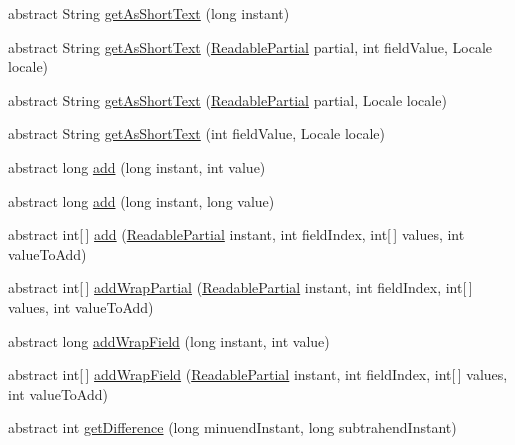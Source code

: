 \begin{DoxyCompactItemize}
abstract String \hyperlink{classorg_1_1joda_1_1time_1_1_date_time_field_ae648d4276a8ce391be96b790d4f46926}{get\-As\-Short\-Text} (long instant)
\item 
abstract String \hyperlink{classorg_1_1joda_1_1time_1_1_date_time_field_acdccf31887f52359f5185d95fe70d9e7}{get\-As\-Short\-Text} (\hyperlink{interfaceorg_1_1joda_1_1time_1_1_readable_partial}{Readable\-Partial} partial, int field\-Value, Locale locale)
\item 
abstract String \hyperlink{classorg_1_1joda_1_1time_1_1_date_time_field_a7717a977276611aa75a1fdf28fbf09ed}{get\-As\-Short\-Text} (\hyperlink{interfaceorg_1_1joda_1_1time_1_1_readable_partial}{Readable\-Partial} partial, Locale locale)
\item 
abstract String \hyperlink{classorg_1_1joda_1_1time_1_1_date_time_field_a7ef443a0920b8cde786fad1c84728c71}{get\-As\-Short\-Text} (int field\-Value, Locale locale)
\item 
abstract long \hyperlink{classorg_1_1joda_1_1time_1_1_date_time_field_a4f89071336324c49ca4a8038f1c35417}{add} (long instant, int value)
\item 
abstract long \hyperlink{classorg_1_1joda_1_1time_1_1_date_time_field_af32597234e1a9f2824b082b999a0bc69}{add} (long instant, long value)
\item 
abstract int\mbox{[}$\,$\mbox{]} \hyperlink{classorg_1_1joda_1_1time_1_1_date_time_field_aeda864911fd1eb6c3d358466c55e8deb}{add} (\hyperlink{interfaceorg_1_1joda_1_1time_1_1_readable_partial}{Readable\-Partial} instant, int field\-Index, int\mbox{[}$\,$\mbox{]} values, int value\-To\-Add)
\item 
abstract int\mbox{[}$\,$\mbox{]} \hyperlink{classorg_1_1joda_1_1time_1_1_date_time_field_a23e4d891841784ce3c6d425d9153a598}{add\-Wrap\-Partial} (\hyperlink{interfaceorg_1_1joda_1_1time_1_1_readable_partial}{Readable\-Partial} instant, int field\-Index, int\mbox{[}$\,$\mbox{]} values, int value\-To\-Add)
\item 
abstract long \hyperlink{classorg_1_1joda_1_1time_1_1_date_time_field_a2bec834f52305b161ce519cb19182fe0}{add\-Wrap\-Field} (long instant, int value)
\item 
abstract int\mbox{[}$\,$\mbox{]} \hyperlink{classorg_1_1joda_1_1time_1_1_date_time_field_ac97fc6b83bb004dfccdd144cc1fdd8f4}{add\-Wrap\-Field} (\hyperlink{interfaceorg_1_1joda_1_1time_1_1_readable_partial}{Readable\-Partial} instant, int field\-Index, int\mbox{[}$\,$\mbox{]} values, int value\-To\-Add)
\item 
abstract int \hyperlink{classorg_1_1joda_1_1time_1_1_date_time_field_ac78ff499df81cf3aba36f833f3893a08}{get\-Difference} (long minuend\-Instant, long subtrahend\-Instant)

\end{DoxyCompactItemize}
